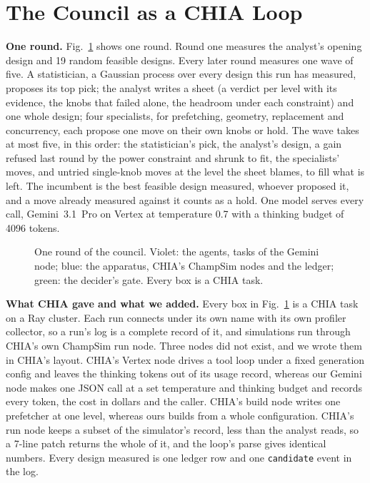 \documentclass[conference]{IEEEtran}
\begin{document}
\section{The Council as a CHIA Loop}\label{sec:council}
\textbf{One round.} Fig.~\ref{fig:loop} shows one round. Round one measures the analyst's opening
design and 19 random feasible designs. Every later round measures one wave of five. A
statistician, a Gaussian process over every design this run has measured, proposes its top pick;
the analyst writes a sheet (a verdict per level with its evidence, the knobs that failed alone,
the headroom under each constraint) and one whole design; four specialists, for prefetching,
geometry, replacement and concurrency, each propose one move on their own knobs or hold. The wave
takes at most five, in this order: the statistician's pick, the analyst's design, a gain refused
last round by the power constraint and shrunk to fit, the specialists' moves, and untried
single-knob moves at the level the sheet blames, to fill what is left. The incumbent is the best
feasible design measured, whoever proposed it, and a move already measured against it counts as
a hold. One model serves every call, Gemini~3.1~Pro on Vertex at temperature 0.7 with a thinking
budget of 4096 tokens. %

\begin{figure}[!t]
\centering
\resizebox{0.95\columnwidth}{!}{}
\caption{One round of the council. Violet: the agents, tasks of the Gemini node; blue: the
apparatus, CHIA's ChampSim nodes and the ledger; green: the decider's gate. Every box is a CHIA
task.}
\label{fig:loop}
\end{figure}

\textbf{What CHIA gave and what we added.} Every box in Fig.~\ref{fig:loop} is a CHIA task on a
Ray \cite{ray} cluster. Each run connects under its own name with its own profiler collector, so
a run's log is a complete record of it, and simulations run through CHIA's own ChampSim run node.
Three nodes did not exist, and we wrote them in CHIA's layout. CHIA's Vertex node drives a tool
loop under a fixed generation config and leaves the thinking tokens out of its usage record,
whereas our Gemini node makes one JSON call at a set temperature and thinking budget and records
every token, the cost in dollars and the caller. CHIA's build node writes one prefetcher at one
level, whereas ours builds from a whole configuration. CHIA's run node keeps a subset of the
simulator's record, less than the analyst reads, so a 7-line patch returns the whole of it, and
the loop's parse gives identical numbers. %
Every design measured is one ledger row and one \texttt{candidate} event in the log.
\end{document}

